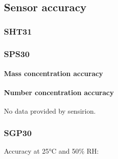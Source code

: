 \subsection*{Sensor accuracy}

\subsubsection*{S\+H\+T31}



\subsubsection*{S\+P\+S30}

\paragraph*{Mass concentration accuracy}



\paragraph*{Number concentration accuracy}

No data provided by sensirion.

\subsubsection*{S\+G\+P30}

Accuracy at 25°C and 50\% RH\+:  
